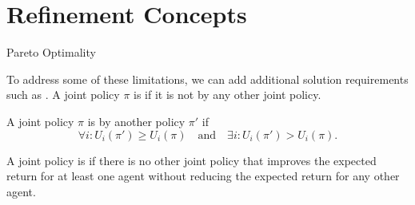 \section{Refinement Concepts}

\begin{frame}{Pareto Optimality}

 To address some of these limitations, we can add additional solution requirements such as . A joint policy \(\pi\) is  if it is not  by any other joint policy.

A joint policy \(\pi\) is  by another policy \(\pi'\) if
 \begin{equation*}
     \forall i: U_i(\pi') \geq U_i(\pi) \quad \text{and} \quad \exists i: U_i(\pi') > U_i(\pi).
 \end{equation*}

\begin{intuitionbox}
    A joint policy is  if there is no other joint policy that improves the expected return for at least one agent without reducing the expected return for any other agent.
\end{intuitionbox}
\end{frame}

